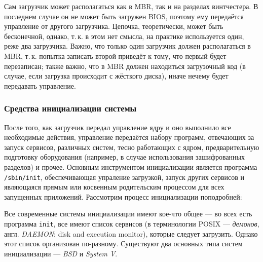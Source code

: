  Сам загрузчик может располагаться как в MBR, так и на разделах винтчестера. В последнем случае он не может быть загружен BIOS, поэтому ему передаётся управление от другого загрузчика. Цепочка, теоретически, может быть бесконечной, однако, т.\,к. в этом нет смысла, на практике используется один, реже два загрузчика. Важно, что только один загрузчик должен располагаться в MBR, т.\,к. попытка записать второй приведёт к тому, что первый будет перезаписан;
 также важно, что в MBR должен находиться загрузочный код (в случае, если загрузка происходит с жёсткого диска), иначе нечему будет передавать управление.
  
\subsubsection{Средства инициализации системы}\label{base:os:structure:bootandinit:init}
После того, как загрузчик передал управление ядру и оно выполнило все необходимые действия, управление передаётся набору программ, отвечающих за запуск сервисов, различных систем, тесно работающих с ядром, предварительную подготовку оборудования (например, в случае использования зашифрованных разделов) и прочее.
Основным инструментом инициализации является программа \texttt{/sbin/init}, обеспечивающая упраление загрузкой, запуск других сервисов и являющаяся прямым или косвенным родительским процессом для всех запущенных приложений. Рассмотрим процесс инициализации поподробней:
  
Все современные системы инициализации имеют кое-что общее --- во всех есть программа \texttt{init}, все имеют список сервисов (в терминологии POSIX --- \emph{демонов}, англ. \emph{DAEMON}: disk and execution monitor), которые следует загрузить. Однако этот список организован по-разному. Существуют два основных типа систем инициализации --- \emph{BSD} и \emph{System V}.
  
